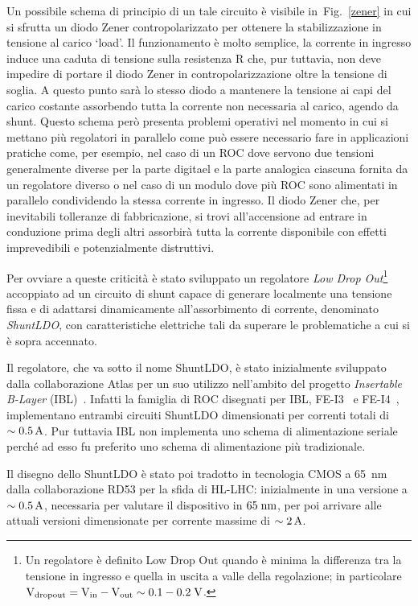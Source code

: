 Un possibile schema di principio di un tale circuito \`e visibile in~Fig.~\ref{zener} in cui si sfrutta un diodo Zener contropolarizzato per ottenere la stabilizzazione in tensione al carico `load'. Il funzionamento è molto semplice, la corrente in ingresso induce una caduta di tensione sulla resistenza R che, pur tuttavia, non deve impedire di portare il diodo Zener in contropolarizzazione oltre la tensione di soglia. A questo punto sarà lo stesso diodo a mantenere la tensione ai capi del carico costante assorbendo tutta la corrente non necessaria al carico, agendo da shunt. 
Questo schema però presenta problemi operativi nel momento in cui si mettano più regolatori in parallelo come pu\`o essere necessario fare in applicazioni pratiche come, per esempio, nel caso di un ROC dove servono due tensioni generalmente diverse per la parte digitael e la parte analogica ciascuna fornita da un regolatore diverso o nel caso di un modulo dove pi\`u ROC sono alimentati in parallelo condividendo la stessa corrente in ingresso. Il diodo Zener che, per inevitabili tolleranze di fabbricazione, si trovi all'accensione ad entrare in conduzione prima degli altri assorbir\`a tutta la corrente disponibile con effetti imprevedibili e potenzialmente distruttivi. 

Per ovviare a queste criticità è stato sviluppato un regolatore \textit{Low Drop Out}\footnote{Un regolatore è definito Low Drop Out quando \`e minima la differenza tra la tensione in ingresso e quella in uscita a valle della regolazione; in particolare$\mathrm{V_{dropout}=V_{in}-V_{out}\sim 0.1-0.2 \rm \; V}$.} accoppiato ad un circuito di shunt capace di generare localmente una tensione fissa e di adattarsi dinamicamente all'assorbimento di corrente, denominato {\em ShuntLDO}, con caratteristiche elettriche tali da superare le problematiche a cui si \`e sopra accennato.

Il regolatore, che va sotto il nome ShuntLDO, \`e stato inizialmente sviluppato dalla collaborazione Atlas per un suo utilizzo nell'ambito del progetto {\em Insertable B-Layer} (IBL)~\cite{IBL}. Infatti la famiglia di ROC disegnati per IBL, FE-I3~\cite{ROCFEI3} e FE-I4~\cite{ROCFEI4}, implementano entrambi circuiti ShuntLDO dimensionati per correnti totali di $\sim 0.5\rm \, A$. Pur tuttavia IBL non implementa uno schema di alimentazione seriale perch\'e ad esso fu preferito uno schema di alimentazione pi\`u tradizionale.

Il disegno dello ShuntLDO \`e stato poi tradotto in tecnologia CMOS a 65~nm dalla collaborazione RD53 per la sfida di HL-LHC: inizialmente in una versione a $\sim 0.5\rm \, A$, necessaria per valutare il dispositivo in $65\rm \; nm$, per poi arrivare alle attuali versioni dimensionate per corrente massime di $\sim 2\rm \, A$.

